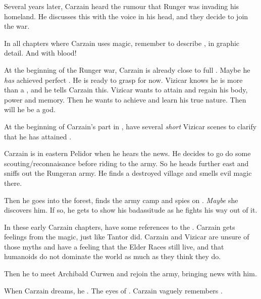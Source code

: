 \begin{changes}
    Several years later, Carzain heard the rumour that Runger was invading his homeland. 
    He discusses this with the voice in his head, and they decide to join the war. 
    
    In all chapters where Carzain uses magic, remember to describe , in graphic detail. 
    And with blood! 

    At the beginning of the Runger war, Carzain is already close to full \kenosis. 
    Maybe he \emph{has} achieved perfect \kenosis. 
    He is ready to grasp for \apotheosis{} now.
    Vizicar knows he is more than a \human, and he tells Carzain this. 
    Vizicar wants to attain \kenosis{} and regain his body, power and memory. 
    Then he wants to achieve \apotheosis{} and learn his true nature.
    Then will he be a god. 

    At the beginning of Carzain's part in \TwilightAngelRememberEmph, have several \emph{short} Vizicar scenes to clarify that he has attained \kenosis. 
    
    Carzain is in eastern Pelidor when he hears the news. 
    He decides to go do some scouting/reconnaisance before riding to the army. 
    So he heads further east and sniffs out the Rungeran army. 
    He finds a destroyed village and smells evil magic there. 
    
    Then he goes into the forest, finds the army camp and spies on \Takestsha. 
    \emph{Maybe} she discovers him. 
    If so, he gets to show his badassitude as he fights his way out of it. 
    
    In these early Carzain chapters, have some references to the . 
    Carzain gets  feelings from the \EreshKali{} magic, just like Tantor did. 
    Carzain and Vizicar are unsure of those myths and have a feeling that the Elder Races still live, and that humanoids do not dominate the world as much as they think they do. 
    
    Then he  to meet Archibald Curwen and rejoin the army, bringing news with him. 
    
    When Carzain dreams, he . 
    The eyes of \Nexagglachel. 
    Carzain vaguely remembers . 
  

\end{changes}
